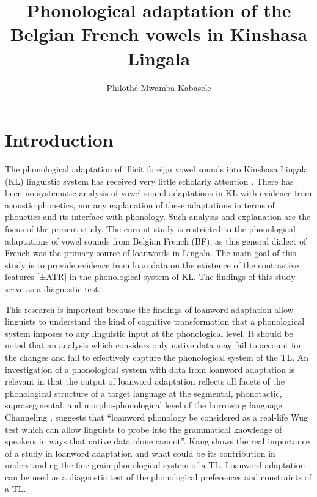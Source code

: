 \documentclass[output=paper]{langscibook}
\author{Philothé Mwamba Kabasele\affiliation{University of Calgary; ISP/Gombe; University of Kwa-Zulu Natal}}
\title{Phonological adaptation of the Belgian French vowels in Kinshasa Lingala}
\begin{document}
\maketitle

\section{Introduction}
The phonological adaptation of illicit foreign vowel sounds into Kinshasa Lingala (KL) linguistic system has received very little scholarly attention \citep{bambi1998preservation,mudimbe1977procedes}. There has been no systematic analysis of vowel sound adaptations in KL with evidence from acoustic phonetics, nor any explanation of these adaptations in terms of phonetics and its interface with phonology. Such analysis and explanation are the focus of the present study. The current study is restricted to the phonological adaptations of vowel sounds from Belgian French (BF), as this general dialect of French was the primary source of loanwords in Lingala. The main goal of this study is to provide evidence from loan data on the existence of the contrastive features [±ATR] in the phonological system of KL. The findings of this study serve as a diagnostic test.

This research is important because the findings of loanword adaptation allow linguists to understand the kind of cognitive transformation that a phonological system imposes to any linguistic input at the phonological level. It should be noted that an analysis which considers only native data may fail to account for the changes and fail to effectively capture the phonological system of the TL. An investigation of a phonological system with data from loanword adaptation is relevant in that the output of loanword adaptation reflects all facets of the phonological structure of a target language at the segmental, phonotactic, suprasegmental, and morpho-phonological level of the borrowing language \citep[1]{kang2011loanword}. Channeling \citet{berko1958child}, \citet[1]{kang2011loanword} suggests that “loanword phonology be considered as a real-life Wug test which can allow linguists to probe into the grammatical knowledge of speakers in ways that native data alone cannot”. Kang shows the real importance of a study in loanword adaptation and what could be its contribution in understanding the fine grain phonological system of a TL. Loanword adaptation can be used as a diagnostic test of the phonological preferences and constraints of a TL.
\end{document}
